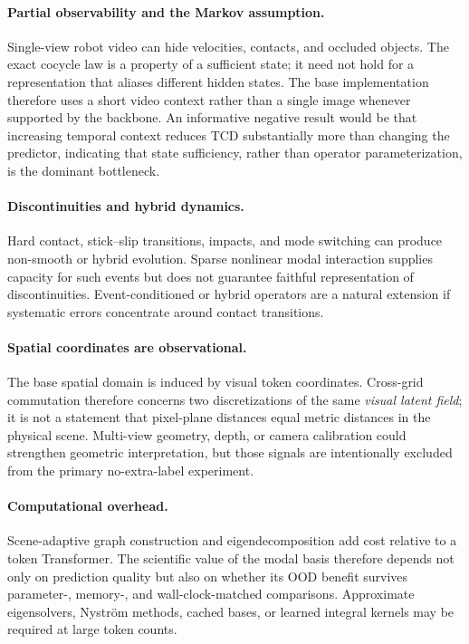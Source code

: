 \documentclass{article}
\theoremstyle{plain}
\theoremstyle{definition}
\theoremstyle{remark}
\begin{document}
\paragraph{Partial observability and the Markov assumption.}
Single-view robot video can hide velocities, contacts, and occluded objects. The exact cocycle law is a property of a sufficient state; it need not hold for a representation that aliases different hidden states. The base implementation therefore uses a short video context rather than a single image whenever supported by the backbone. An informative negative result would be that increasing temporal context reduces TCD substantially more than changing the predictor, indicating that state sufficiency, rather than operator parameterization, is the dominant bottleneck.

\paragraph{Discontinuities and hybrid dynamics.}
Hard contact, stick--slip transitions, impacts, and mode switching can produce non-smooth or hybrid evolution. Sparse nonlinear modal interaction supplies capacity for such events but does not guarantee faithful representation of discontinuities. Event-conditioned or hybrid operators are a natural extension if systematic errors concentrate around contact transitions.

\paragraph{Spatial coordinates are observational.}
The base spatial domain is induced by visual token coordinates. Cross-grid commutation therefore concerns two discretizations of the same \emph{visual latent field}; it is not a statement that pixel-plane distances equal metric distances in the physical scene. Multi-view geometry, depth, or camera calibration could strengthen geometric interpretation, but those signals are intentionally excluded from the primary no-extra-label experiment.

\paragraph{Computational overhead.}
Scene-adaptive graph construction and eigendecomposition add cost relative to a token Transformer. The scientific value of the modal basis therefore depends not only on prediction quality but also on whether its OOD benefit survives parameter-, memory-, and wall-clock-matched comparisons. Approximate eigensolvers, Nystr\"om methods, cached bases, or learned integral kernels may be required at large token counts.
\end{document}
